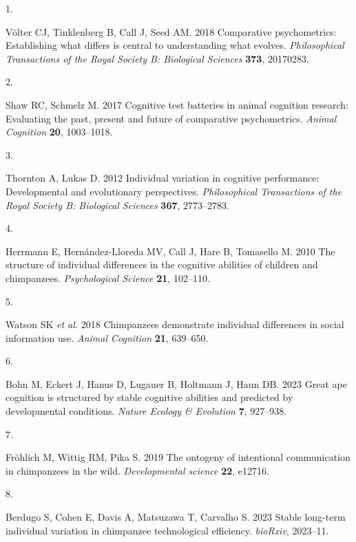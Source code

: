 \documentclass[
  man,floatsintext]{apa6}
\newlength{\cslhangindent}
\newlength{\csllabelwidth}
\newenvironment{CSLReferences}[2] %
 {\begin{list}{}{%
  \setlength{\itemindent}{0pt}
  \setlength{\leftmargin}{0pt}
  \setlength{\parsep}{0pt}
  \ifodd #1
   \setlength{\leftmargin}{\cslhangindent}
   \setlength{\itemindent}{-1\cslhangindent}
  \fi
  \setlength{\itemsep}{#2\baselineskip}}}
 {\end{list}}
\newcommand{\CSLLeftMargin}[1]{\parbox[t]{\csllabelwidth}{\strut#1\strut}}
\newcommand{\CSLRightInline}[1]{\parbox[t]{\linewidth - \csllabelwidth}{\strut#1\strut}}
\begin{document}
\label{refs}
\begin{CSLReferences}{0}{1}
\CSLLeftMargin{1. }%
\CSLRightInline{Völter CJ, Tinklenberg B, Call J, Seed AM. 2018 Comparative psychometrics: Establishing what differs is central to understanding what evolves. \emph{Philosophical Transactions of the Royal Society B: Biological Sciences} \textbf{373}, 20170283.}

\CSLLeftMargin{2. }%
\CSLRightInline{Shaw RC, Schmelz M. 2017 Cognitive test batteries in animal cognition research: Evaluating the past, present and future of comparative psychometrics. \emph{Animal Cognition} \textbf{20}, 1003--1018.}

\CSLLeftMargin{3. }%
\CSLRightInline{Thornton A, Lukas D. 2012 Individual variation in cognitive performance: Developmental and evolutionary perspectives. \emph{Philosophical Transactions of the Royal Society B: Biological Sciences} \textbf{367}, 2773--2783.}

\CSLLeftMargin{4. }%
\CSLRightInline{Herrmann E, Hernández-Lloreda MV, Call J, Hare B, Tomasello M. 2010 The structure of individual differences in the cognitive abilities of children and chimpanzees. \emph{Psychological Science} \textbf{21}, 102--110.}

\CSLLeftMargin{5. }%
\CSLRightInline{Watson SK \emph{et al.} 2018 Chimpanzees demonstrate individual differences in social information use. \emph{Animal Cognition} \textbf{21}, 639--650.}

\CSLLeftMargin{6. }%
\CSLRightInline{Bohn M, Eckert J, Hanus D, Lugauer B, Holtmann J, Haun DB. 2023 Great ape cognition is structured by stable cognitive abilities and predicted by developmental conditions. \emph{Nature Ecology \& Evolution} \textbf{7}, 927--938.}

\CSLLeftMargin{7. }%
\CSLRightInline{Fröhlich M, Wittig RM, Pika S. 2019 The ontogeny of intentional communication in chimpanzees in the wild. \emph{Developmental science} \textbf{22}, e12716.}

\CSLLeftMargin{8. }%
\CSLRightInline{Berdugo S, Cohen E, Davis A, Matsuzawa T, Carvalho S. 2023 Stable long-term individual variation in chimpanzee technological efficiency. \emph{bioRxiv}, 2023--11.}


\end{CSLReferences}
\end{document}
